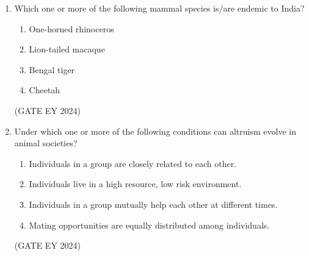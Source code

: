 \documentclass[journal]{IEEEtran}
\begin{document}
\begin{enumerate}
\item Which one or more of the following mammal species is/are endemic to India?
    \begin{multicols}{2}
    \begin{enumerate}
        \item One-horned rhinoceros
        \item Lion-tailed macaque
        \item Bengal tiger
        \item Cheetah
    \end{enumerate}
    \end{multicols}
\hfill{(GATE EY 2024)}

\item Under which one or more of the following conditions can altruism evolve in animal societies?
    \begin{enumerate}
        \item Individuals in a group are closely related to each other.
        \item Individuals live in a high resource, low risk environment.
        \item Individuals in a group mutually help each other at different times.
        \item Mating opportunities are equally distributed among individuals.
    \end{enumerate}
\hfill{(GATE EY 2024)}


\end{enumerate}
\end{document}
